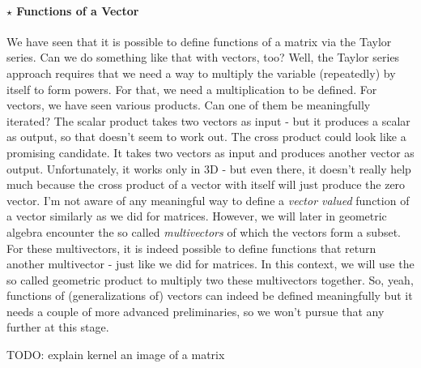 
\paragraph{$\star$ Functions of a Vector}
We have seen that it is possible to define functions of a matrix via the Taylor series. Can we do something like that with vectors, too? Well, the Taylor series approach requires that we need a way to multiply the variable (repeatedly) by itself to form powers. For that, we need a multiplication to be defined. For vectors, we have seen various products. Can one of them be meaningfully iterated? The scalar product takes two vectors as input - but it produces a scalar as output, so that doesn't seem to work out. The cross product could look like a promising candidate. It takes two vectors as input and produces another vector as output. Unfortunately, it works only in 3D - but even there, it doesn't really help much because the cross product of a vector with itself will just produce the zero vector. I'm not aware of any meaningful way to define a \emph{vector valued} function of a vector similarly as we did for matrices. However, we will later in geometric algebra encounter the so called \emph{multivectors} of which the vectors form a subset. For these multivectors, it is indeed possible to define functions that return another multivector - just like we did for matrices. In this context, we will use the so called geometric product to multiply two these multivectors together. So, yeah, functions of (generalizations of) vectors can indeed be defined meaningfully but it needs a couple of more advanced preliminaries, so we won't pursue that any further at this stage.

\medskip
TODO: explain kernel an image of a matrix





%

